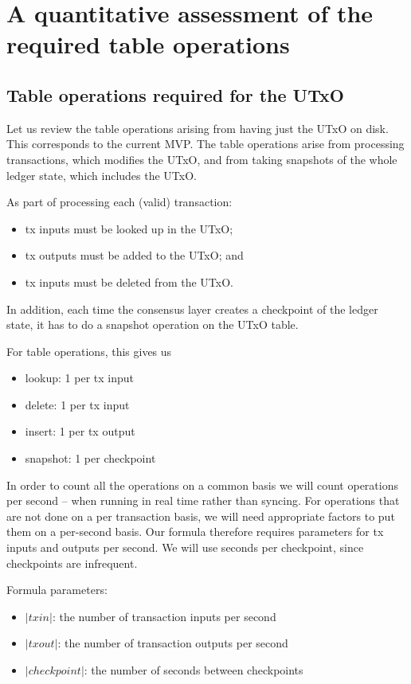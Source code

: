 \documentclass[11pt,a4paper]{article}
\begin{document}
\section{A quantitative assessment of the required table operations}
\label{sec:quantitative-assessment-of-the-required-table-operations}

\subsection{Table operations required for the UTxO}
\label{sec:table-operations-required-for-the-utxo}

Let us review the table operations arising from having just the UTxO on disk.
This corresponds to the current MVP. The table operations arise from processing
transactions, which modifies the UTxO, and from taking snapshots of the whole
ledger state, which includes the UTxO.

As part of processing each (valid) transaction:
\begin{itemize}
\item tx inputs must be looked up in the UTxO;
\item tx outputs must be added to the UTxO; and
\item tx inputs must be deleted from the UTxO.
\end{itemize}
In addition, each time the consensus layer creates a checkpoint of the ledger
state, it has to do a {\sc snapshot} operation on the UTxO table.

For table operations, this gives us
\begin{itemize}
\item {\sc lookup}: 1 per tx input
\item {\sc delete}: 1 per tx input
\item {\sc insert}: 1 per tx output
\item {\sc snapshot}: 1 per checkpoint
\end{itemize}

In order to count all the operations on a common basis we will count operations
per second -- when running in real time rather than syncing. For operations
that are not done on a per transaction basis, we will need appropriate factors
to put them on a per-second basis. Our formula therefore requires parameters
for tx inputs and outputs per second. We will use seconds per checkpoint, since
checkpoints are infrequent.

Formula parameters:
\begin{itemize}
\item $|\mathit{txin}|$: the number of transaction inputs per second
\item $|\mathit{txout}|$: the number of transaction outputs per second
\item $|\mathit{checkpoint}|$: the number of seconds between checkpoints
\end{itemize}
\end{document}
